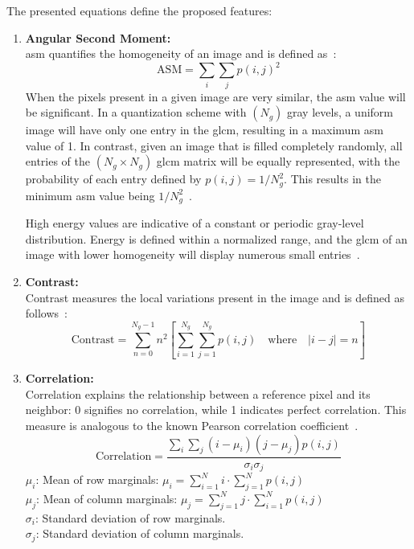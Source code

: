 The presented equations define the proposed features:
\begin{enumerate}
\newcommand{\tightitem}[1]{\begin{samepage}\item #1\end{samepage}}
    \item \textbf{Angular Second Moment:}\\
    \acf{asm} quantifies the homogeneity of an image and is defined as~\cite {haralick_textural_1973}:
        \begin{equation}
            \text{ASM} = \sum_{i} \sum_{j} p(i,j)^2
        \end{equation}
    When the pixels present in a given image are very similar, the \ac{asm} value will be significant. In a quantization scheme with $(N_g)$ gray levels, a uniform image will have only one entry in the \ac{glcm}, resulting in a maximum \ac{asm} value of 1. In contrast, given an image that is filled completely randomly, all entries of the $(N_g \times N_g)$ \ac{glcm} matrix will be equally represented, with the probability of each entry defined by $p(i, j) = {1}/{N_g^2}$.
    This results in the minimum \ac{asm} value being ${1}/{N_g^2}$~\cite{oprisan_bounds_2023}.

    High energy values are indicative of a constant or periodic gray-level distribution. Energy is defined within a normalized range, and the \ac{glcm} of an image with lower homogeneity will display numerous small entries~\cite{oprisan_bounds_2023}.
    
    \item \textbf{Contrast:}\\
    Contrast measures the local variations present in the image and is defined as follows~\cite {haralick_textural_1973}:
        \begin{equation}
            \text{Contrast} = \sum_{n=0}^{N_g - 1} n^2 \left[ \sum_{i=1}^{N_g} \sum_{j=1}^{N_g} p(i,j) \quad \text{where} \quad |i - j| = n \right]
        \end{equation}
        
    \item \textbf{Correlation:}\\
    Correlation explains the relationship between a reference pixel and its neighbor: 0 signifies no correlation, while 1 indicates perfect correlation. This measure is analogous to the known Pearson correlation coefficient~\cite{oprisan_bounds_2023}.
        \begin{equation}
            \text{Correlation} = \frac{\sum_{i} \sum_{j} (i - \mu_i)(j - \mu_j) p(i,j)}{\sigma_i \sigma_j}
        \end{equation}
    $\mu_i$: Mean of row marginals: $\mu_i = \sum_{i=1}^{N} i \cdot \sum_{j=1}^{N} p(i,j)$ \\
    $\mu_j$: Mean of column marginals: $\mu_j = \sum_{j=1}^{N} j \cdot \sum_{i=1}^{N} p(i,j)$ \\
    $\sigma_i$: Standard deviation of row marginals. \\
    $\sigma_j$: Standard deviation of column marginals.\\
        

\end{enumerate}
